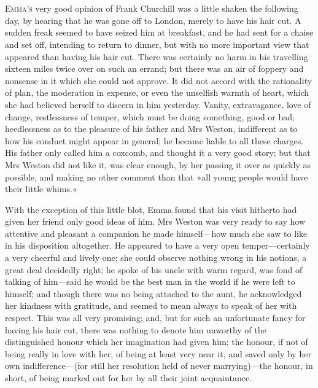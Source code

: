 \chapter[Chapter \thechapter]{}
\lettrine[lines=4,lraise=0.3]{E}{mma's} very good opinion of Frank Churchill was a little shaken the following day, by hearing that he was gone off to London, merely to have his hair cut. A sudden freak seemed to have seized him at breakfast, and he had sent for a chaise and set off, intending to return to dinner, but with no more important view that appeared than having his hair cut. There was certainly no harm in his travelling sixteen miles twice over on such an errand; but there was an air of foppery and nonsense in it which she could not approve. It did not accord with the rationality of plan, the moderation in expense, or even the unselfish warmth of heart, which she had believed herself to discern in him yesterday. Vanity, extravagance, love of change, restlessness of temper, which must be doing something, good or bad; heedlessness as to the pleasure of his father and Mrs Weston, indifferent as to how his conduct might appear in general; he became liable to all these charges. His father only called him a coxcomb, and thought it a very good story; but that Mrs Weston did not like it, was clear enough, by her passing it over as quickly as possible, and making no other comment than that »all young people would have their little whims.«

With the exception of this little blot, Emma found that his visit hitherto had given her friend only good ideas of him. Mrs Weston was very ready to say how attentive and pleasant a companion he made himself—how much she saw to like in his disposition altogether. He appeared to have a very open temper—certainly a very cheerful and lively one; she could observe nothing wrong in his notions, a great deal decidedly right; he spoke of his uncle with warm regard, was fond of talking of him—said he would be the best man in the world if he were left to himself; and though there was no being attached to the aunt, he acknowledged her kindness with gratitude, and seemed to mean always to speak of her with respect. This was all very promising; and, but for such an unfortunate fancy for having his hair cut, there was nothing to denote him unworthy of the distinguished honour which her imagination had given him; the honour, if not of being really in love with her, of being at least very near it, and saved only by her own indifference—(for still her resolution held of never marrying)—the honour, in short, of being marked out for her by all their joint acquaintance.

